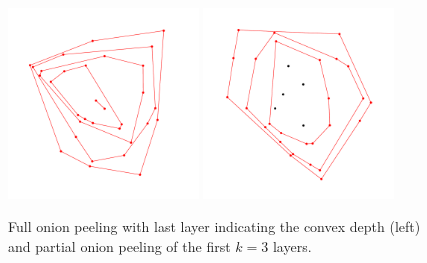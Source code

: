 \documentclass{article}
\begin{document}
\begin{itemize}
\begin{figure}[h]
\center
\includegraphics[width=0.45\textwidth]{Fig-FullConvexLayers} %
\includegraphics[width=0.45\textwidth]{Fig-PartialConvexLayers} %
\caption{Full onion peeling with last layer indicating the convex depth (left) and partial onion peeling of the first $k=3$ layers.}
\label{fig:chpeeling}

\end{figure}

\end{itemize}



%

\end{document}
